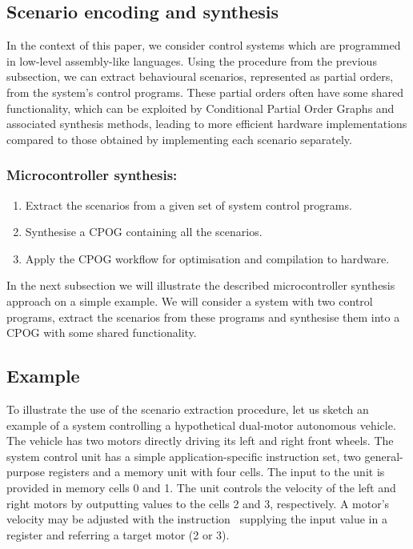 \subsection{Scenario encoding and synthesis}

In the context of this paper, we consider control systems which are programmed
in low-level assembly-like languages. Using the procedure from the previous subsection,
we can extract behavioural scenarios, represented as partial orders, from the
system's control programs. These partial orders often have some shared
functionality, which can be exploited by Conditional Partial Order Graphs and
associated synthesis methods, leading to more efficient hardware implementations
compared to those obtained by implementing each scenario separately.

\vspace{-5mm}
\subsubsection{Microcontroller synthesis:}
\begin{enumerate}
\vspace{-2mm}
    \item Extract the scenarios from a given set of system control programs.
    \item Synthesise a CPOG containing all the scenarios.
    \item Apply the CPOG workflow for optimisation and compilation to hardware.
\end{enumerate}


In the next subsection we will illustrate the described microcontroller
synthesis approach on a simple example. We will consider a system with two
control programs, extract the scenarios from these programs and synthesise them
into a CPOG with some shared functionality.

\vspace{-3mm}
\subsection{Example}

To illustrate the use of the scenario extraction procedure, let us sketch an
example of a system controlling a hypothetical dual-motor autonomous vehicle.
The vehicle has two motors directly driving its left and right front wheels.
The system control unit has a simple application-specific instruction set, two
general-purpose registers and a memory unit with four cells. The input to the
unit is provided in memory cells 0 and 1. The unit controls the velocity of the
left and right motors by outputting values to the cells 2 and 3, respectively.
A motor's velocity may be adjusted with the instruction~ supplying
the input value in a register and referring a target motor (2 or 3).


